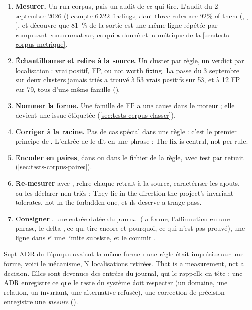 \begin{enumerate}
  \item \textbf{Mesurer.} Un run corpus, puis un audit de ce qui tire. L'audit du 2 septembre 2026 () compte 6\,322 findings, dont \og three rules are 92\% of them\fg{} (, , ), et découvre que 81~\% de la sortie est une même ligne répétée par composant consommateur, ce qui a donné  et la métrique de la \cref{sec:tests-corpus-metrique}.
  \item \textbf{Échantillonner et relire à la source.} Un cluster par règle, un verdict par localisation : vrai positif, FP, ou \og not worth fixing\fg{}. La passe du 3 septembre sur deux clusters jamais triés a trouvé  à 53 vrais positifs sur 53, et  à 12 FP sur 79, tous d'une même famille ().
  \item \textbf{Nommer la forme.} Une famille de FP a une cause dans le moteur ; elle devient une issue étiquetée (\cref{sec:tests-corpus-classer}).
  \item \textbf{Corriger à la racine.} Pas de cas spécial dans une règle : c'est le premier principe de . L'entrée de  le dit en une phrase : \og The fix is central, not per rule\fg{}.
  \item \textbf{Encoder en paires}, dans  ou dans le fichier de la règle, avec test par retrait (\cref{sec:tests-corpus-paires}).
  \item \textbf{Re-mesurer} avec , relire chaque retrait à la source, caractériser les ajouts, ou les déclarer non triés : \og They lie in the direction the project's invariant tolerates, not in the forbidden one\fg{}, et ils \og deserve a triage pass\fg{}.
  \item \textbf{Consigner} : une entrée datée du journal (la forme, l'affirmation en une phrase, le delta , ce qui tire encore et pourquoi, ce qui n'est pas prouvé), une ligne dans  si une limite subsiste, et le commit .
\end{enumerate}

\begin{decision}
Sept ADR de l'époque avaient la même forme : une règle était imprécise sur une forme, voici le mécanisme, N localisations retirées. \og That is a measurement, not a decision.\fg{} Elles sont devenues des entrées du journal, qui le rappelle en tête : une ADR enregistre ce que le reste du système doit respecter (un domaine, une relation, un invariant, une alternative refusée), une correction de précision enregistre une \emph{mesure} ().
\end{decision}

